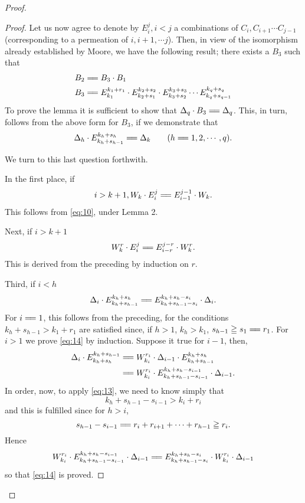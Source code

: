 \documentclass[9pt, twoside]{extarticle}
\newcommand\longeq{=\joinrel=}
\begin{document}
\begin{proof}
\begin{proof}
  Let us now agree to denote by \(E_i^j, i<j\) a combinations of \(C_i, C_{i+1} \cdots C_{j-1}\)
  (corresponding to a permeation of \(i, i+1, \cdots j\)). Then, in view of the
  isomorphism already established by Moore, we have the following result;
  there exists a \(B_3\) such that
  \begin{align*}
    B_2 &\longeq B_3 \cdot B_1 \\
    B_3 &\longeq E_{k_1}^{k_1 + r_1} \cdot E_{k_2 + s_1}^{k_2 + s_2} \cdot E_{k_3 + s_2}^{k_3 + s_3} \cdots E_{k_q + s_{q-1}}^{k_q + s_q}
  \end{align*}
  \indent To prove the lemma it is sufficient to show that \(\Delta_q \cdot B_3 \longeq \Delta_q\). This, in
  turn, follows from the above form for \(B_3\), if we demonstrate that
  \begin{equation}
    \label{eq:12}
    \Delta_h \cdot E_{k_h + s_{h-1}}^{k_h + s_h} \longeq \Delta_k \qquad (h\longeq 1, 2, \cdots, q).
  \end{equation}

  \noindent We turn to this last question forthwith.

  In the first place, if
  \[ i > k+1, W_k \cdot E_i^j \longeq E_{i-1}^{j-1} \cdot W_k. \]
  This follows from \eqref{eq:10}, under Lemma 2.

  Next, if \(i>k+1\)
  \begin{equation}
    \label{eq:13}
    W_k^r \cdot E_i^j \longeq E_{i-r}^{j-r} \cdot W_k^r.
  \end{equation}
  This is derived from the preceding by induction on \(r\).

  Third, if \(i < h\)
  \begin{equation}
    \label{eq:14}
    \Delta_i \cdot E_{k_h + s_{h-1}}^{k_h + s_{h}} \longeq E_{k_h + s_{h-1} - s_i}^{k_h + s_h - s_i} \cdot \Delta_i.
  \end{equation}
  For \(i\longeq 1\), this follows from the preceding, for the conditions \(k_h + s_{h-1} > k_1 + r_1\)
  are satisfied since, if \(h > 1\), \(k_h > k_1\), \(s_{h-1} \geqq s_1 \longeq r_1\). For \(i > 1\)
  we prove \eqref{eq:14} by induction. Suppose it true for \(i-1\), then,
  \begin{align*}
    \Delta_i \cdot E_{k_h + s_h}^{k_h + s_{h-1}} &\longeq W_{k_i}^{r_i} \cdot \Delta_{i-1} \cdot E_{k_h + s_{h-1}}^{k_h + s_h} \\
                                                 &\longeq W_{k_i}^{r_i} \cdot E_{k_h + s_{h-1} - s_{i-1}}^{k_h + s_h - s_{i-1}} \cdot \Delta_{i-1}.
  \end{align*}
  In order, now, to apply \eqref{eq:13}, we need to know simply that
  \[k_h + s_{h-1} - s_{i-1} > k_i + r_i\]
  and this is fulfilled since for \(h > i\),
  \[s_{h-1} - s_{i-1} \longeq r_i + r_{i+1} + \cdots + r_{h-1} \geqq r_i.\]
  Hence
  \[W_{k_i}^{r_i} \cdot E_{k_h + s_{h-1} - s_{i-1}}^{k_h + s_h - s_{i-1}} \cdot \Delta_{i-1} \longeq E_{k_h + s_{h-1} - s_i}^{k_h + s_h - s_i} \cdot W_{k_i}^{r_i} \cdot \Delta_{i-1}\]
  so that \eqref{eq:14} is proved.


\end{proof}
\end{proof}
\end{document}
